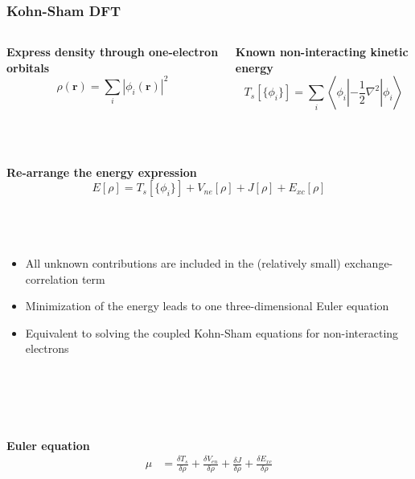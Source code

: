 \documentclass[mathserif, 8pt]{beamer}
\begin{document}
\begin{frame}
    \frametitle{Kohn-Sham DFT}
    \begin{columns}
    \begin{column}{.50\textwidth}
    \centering
    \textbf{Express density through one-electron orbitals}
    \begin{equation}
	\nonumber
	\rho(\boldsymbol{r}) = \sum_i |\phi_i(\boldsymbol{r})|^2
    \end{equation}
    \end{column}
    \begin{column}{.50\textwidth}
    \centering
    \textbf{Known non-interacting kinetic energy}
    \begin{equation}
	\nonumber
	T_s[\lbrace\phi_i\rbrace] = \sum_i \left<\phi_i\left|-\frac{1}{2}\nabla^2\right|\phi_i\right>
    \end{equation}
    \end{column}
    \end{columns}
    \ \\
    \ \\
    \centering
    \textbf{Re-arrange the energy expression}
    \begin{equation}
	\nonumber
	E[\rho] = T_s[\lbrace\phi_i\rbrace] + V_{ne}[\rho] + J[\rho] + E_{xc}[\rho]
    \end{equation}
    \ \\
    \ \\
    \ \\
    \begin{itemize}
	\item	All unknown contributions are included in the (relatively small) exchange-correlation term
	\item	Minimization of the energy leads to one three-dimensional Euler equation
	\item	Equivalent to solving the coupled Kohn-Sham equations for non-interacting electrons
    \end{itemize}
    \ \\
    \ \\
    \ \\
    \begin{columns}
    \begin{column}{.50\textwidth}
    \centering
    \textbf{Euler equation}
    \begin{align}
	\nonumber
	\mu &=
	\frac{\delta T_s}{\delta \rho} + 
	\frac{\delta V_{en}}{\delta \rho} + 
	\frac{\delta J}{\delta \rho} + 
	\frac{\delta E_{xc}}{\delta \rho}\\

\end{align}
\end{column}
\end{columns}
\end{frame}
\end{document}
